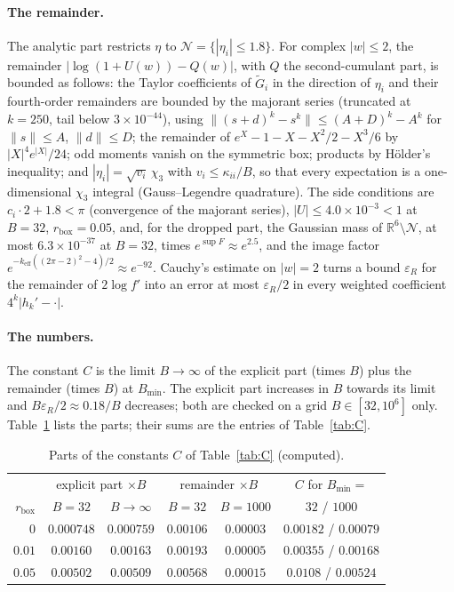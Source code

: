 \documentclass[11pt,a4paper]{article}
\theoremstyle{definition}
\theoremstyle{remark}
\newcommand{\R}{\mathbb{R}}
\begin{document}
\paragraph{The remainder.}
The analytic part restricts $\eta$ to $\mathcal N=\{|\eta_i|\le1.8\}$.
For complex $|w|\le2$, the remainder $|\log(1+U(w))-Q(w)|$, with $Q$ the second-cumulant part, is bounded as follows: the Taylor coefficients of $\tilde G_i$ in the direction of $\eta_i$ and their fourth-order remainders are bounded by the majorant series (truncated at $k=250$, tail below $3\times10^{-44}$), using $\|(s+d)^k-s^k\|\le(A+D)^k-A^k$ for $\|s\|\le A$, $\|d\|\le D$; the remainder of $e^X-1-X-X^2/2-X^3/6$ by $|X|^4e^{|X|}/24$; odd moments vanish on the symmetric box; products by H\"older's inequality; and $|\eta_i|=\sqrt{v_i}\,\chi_3$ with $v_i\le\kappa_{ii}/B$, so that every expectation is a one-dimensional $\chi_3$ integral (Gauss--Legendre quadrature).
The side conditions are $c_i\cdot2+1.8<\pi$ (convergence of the majorant series), $|U|\le4.0\times10^{-3}<1$ at $B=32$, $r_{\mathrm{box}}=0.05$, and, for the dropped part, the Gaussian mass of $\R^6\setminus\mathcal N$, at most $6.3\times10^{-37}$ at $B=32$, times $e^{\sup F}\approx e^{2.5}$, and the image factor $e^{-k_{\mathrm{eff}}((2\pi-2)^2-4)/2}\approx e^{-92}$.
Cauchy's estimate on $|w|=2$ turns a bound $\varepsilon_R$ for the remainder of $2\log f'$ into an error at most $\varepsilon_R/2$ in every weighted coefficient $4^k|h_k'-\cdot|$.

\paragraph{The numbers.}
The constant $C$ is the limit $B\to\infty$ of the explicit part (times $B$) plus the remainder (times $B$) at $B_{\min}$.
The explicit part increases in $B$ towards its limit and $B\varepsilon_R/2\approx0.18/B$ decreases; both are checked on a grid $B\in[32,10^6]$ only.
Table~\ref{tab:Cparts} lists the parts; their sums are the entries of Table~\ref{tab:C}.

\begin{table}[h]
\centering\small
\caption{Parts of the constants $C$ of Table~\ref{tab:C} (computed).}\label{tab:Cparts}
\begin{tabular}{@{}rccccc@{}}
\toprule
 & \multicolumn{2}{c}{explicit part $\times B$} & \multicolumn{2}{c}{remainder $\times B$} & $C$ for $B_{\min}=$ \\
$r_{\mathrm{box}}$ & $B=32$ & $B\to\infty$ & $B=32$ & $B=1000$ & $32$ / $1000$ \\ \midrule
$0$ & $0.000748$ & $0.000759$ & $0.00106$ & $0.00003$ & $0.00182$ / $0.00079$ \\
$0.01$ & $0.00160$ & $0.00163$ & $0.00193$ & $0.00005$ & $0.00355$ / $0.00168$ \\
$0.05$ & $0.00502$ & $0.00509$ & $0.00568$ & $0.00015$ & $0.0108$ / $0.00524$ \\
\bottomrule
\end{tabular}
\end{table}
\end{document}
